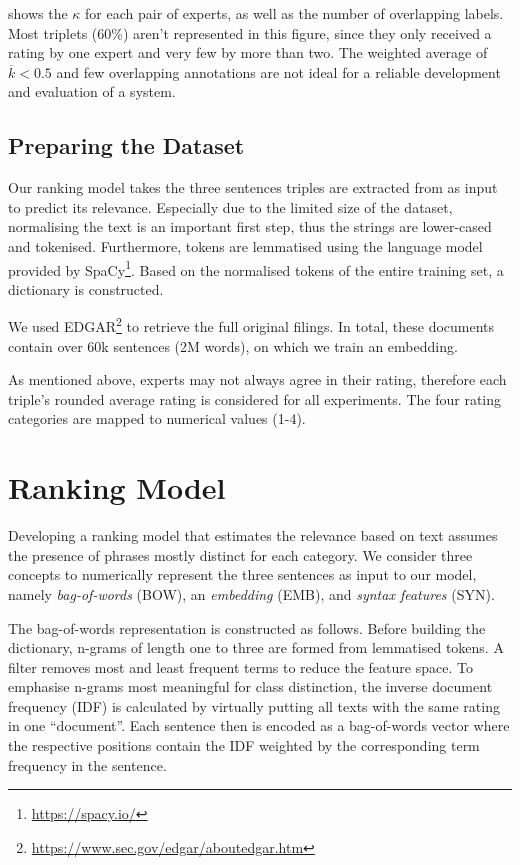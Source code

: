  shows the $\kappa$ for each pair of experts, as well as the number of overlapping labels. Most triplets (60\%) aren't represented in this figure, since they only received a rating by one expert and very few by more than two. The weighted average of $\overline{k}<0.5$ and few overlapping annotations are not ideal for a reliable development and evaluation of a system.

\subsection{Preparing the Dataset}
Our ranking model takes the three sentences triples are extracted from as input to predict its relevance.
Especially due to the limited size of the dataset, normalising the text is an important first step, thus the strings are lower-cased and tokenised. 
Furthermore, tokens are lemmatised using the language model provided by SpaCy\footnote{\url{https://spacy.io/}}.
Based on the normalised tokens of the entire training set, a dictionary is constructed.

We used EDGAR\footnote{\url{https://www.sec.gov/edgar/aboutedgar.htm}} to retrieve the full original filings. In total, these documents contain over 60k sentences (2M words), on which we train an embedding.

As mentioned above, experts may not always agree in their rating, therefore each triple's rounded average rating is considered for all experiments.
The four rating categories are mapped to numerical values (1-4).

\section{Ranking Model}
Developing a ranking model that estimates the relevance based on text assumes the presence of phrases mostly distinct for each category.
We consider three concepts to numerically represent the three sentences as input to our model, namely \textit{bag-of-words} (BOW), an \textit{embedding} (EMB), and \textit{syntax features} (SYN).

The bag-of-words representation is constructed as follows. 
Before building the dictionary, n-grams of length one to three are formed from lemmatised tokens. 
A filter removes most and least frequent terms to reduce the feature space. To emphasise n-grams most meaningful for class distinction, the inverse document frequency (IDF) is calculated by virtually putting all texts with the same rating in one ``document''. 
Each sentence then is encoded as a bag-of-words vector where the respective positions contain the IDF weighted by the corresponding term frequency in the sentence.

